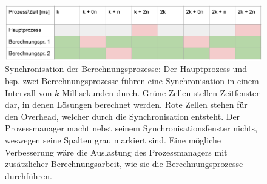 \begin{figure}[h!]
    \begin{center}
        \includegraphics[width=0.8\linewidth]{../common/03_billiard_ai/resources/15_berechnungsprozess_synchronisation.png}
    \end{center}
    \caption{
        Synchronisation der Berechnungsprozesse: Der Hauptprozess und bsp. zwei Berechnungsprozesse führen eine
        Synchronisation in einem Intervall von $k$ Millisekunden durch.
        Grüne Zellen stellen Zeitfenster dar, in denen Lösungen berechnet werden.
        Rote Zellen stehen für den Overhead, welcher durch die Synchronisation entsteht.
        Der Prozessmanager macht nebst seinem Synchronisationsfenster nichts, weswegen seine Spalten grau markiert sind.
        Eine mögliche Verbesserung wäre die Auslastung des Prozessmanagers mit zusätzlicher
        Berechnungsarbeit, wie sie die Berechnungsprozesse durchführen.
    }
    \label{fig:berechnungsprozess_synchronisation}
\end{figure}
